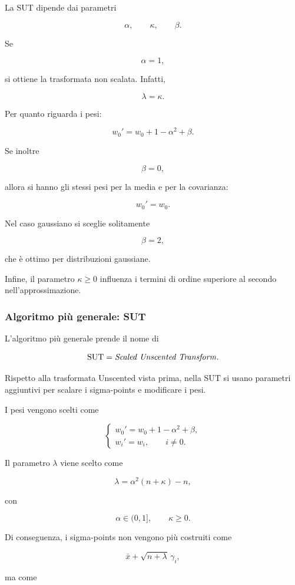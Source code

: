 \documentclass[11pt,a4paper]{article}
\begin{document}
La SUT dipende dai parametri

\[
\alpha,\qquad \kappa,\qquad \beta.
\]

Se

\[
\alpha=1,
\]

si ottiene la trasformata non scalata. Infatti,

\[
\lambda=\kappa.
\]

Per quanto riguarda i pesi:

\[
w_0' = w_0 + 1-\alpha^2+\beta.
\]

Se inoltre

\[
\beta=0,
\]

allora si hanno gli stessi pesi per la media e per la covarianza:

\[
w_0'=w_0.
\]

Nel caso gaussiano si sceglie solitamente

\[
\beta=2,
\]

che è ottimo per distribuzioni gaussiane.

Infine, il parametro \(\kappa\geq 0\) influenza i termini di ordine superiore al secondo nell'approssimazione.\subsubsection*{Algoritmo più generale: SUT}

L'algoritmo più generale prende il nome di

\[
\text{SUT} = \text{\emph{Scaled Unscented Transform}}.
\]

Rispetto alla trasformata Unscented vista prima, nella SUT si usano parametri aggiuntivi per scalare i sigma-points e modificare i pesi.

I pesi vengono scelti come

\[
\begin{cases}
w_0' = w_0 + 1-\alpha^2+\beta,\\[0.4em]
w_i' = w_i, \qquad i\neq 0.
\end{cases}
\]

Il parametro \(\lambda\) viene scelto come

\[
\lambda=\alpha^2(n+\kappa)-n,
\]

con

\[
\alpha\in(0,1],
\qquad
\kappa\geq 0.
\]

Di conseguenza, i sigma-points non vengono più costruiti come

\[
\bar x+\sqrt{n+\lambda}\,\gamma_i,
\]

ma come
\end{document}
